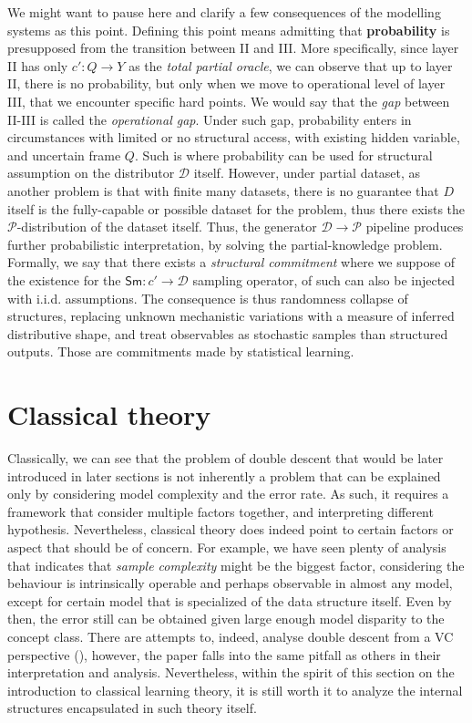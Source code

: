We might want to pause here and clarify a few consequences of the modelling systems as this point. Defining this point means admitting that \textbf{probability} is presupposed from the transition between II and III. More specifically, since layer II has only $c':Q\to Y$ as the \textit{total partial oracle}, we can observe that up to layer II, there is no probability, but only when we move to operational level of layer III, that we encounter specific hard points. We would say that the \textit{gap} between II-III is called the \textit{operational gap}. Under such gap, probability enters in circumstances with limited or no structural access, with existing hidden variable, and uncertain frame $Q$. Such is where probability can be used for structural assumption on the distributor $\mathcal{D}$ itself. However, under partial dataset, as another problem is that with finite many datasets, there is no guarantee that $D$ itself is the fully-capable or possible dataset for the problem, thus there exists the $\mathcal{P}$-distribution of the dataset itself. Thus, the generator $\mathcal{D}\to\mathcal{P}$ pipeline produces further probabilistic interpretation, by solving the partial-knowledge problem. Formally, we say that there exists a \textit{structural commitment} where we suppose of the existence for the $\mathsf{Sm}:c'\to\mathcal{D}$ sampling operator, of such can also be injected with i.i.d. assumptions. The consequence is thus randomness collapse of structures, replacing unknown mechanistic variations with a measure of inferred distributive shape, and treat observables as stochastic samples than structured outputs. Those are commitments made by statistical learning. 


\section{Classical theory}

Classically, we can see that the problem of double descent that would be later introduced in later sections is not inherently a problem that can be explained only by considering model complexity and the error rate. As such, it requires a framework that consider multiple factors together, and interpreting different hypothesis. Nevertheless, classical theory does indeed point to certain factors or aspect that should be of concern. For example, we have seen plenty of analysis that indicates that \textit{sample complexity} might be the biggest factor, considering the behaviour is intrinsically operable and perhaps observable in almost any model, except for certain model that is specialized of the data structure itself. Even by then, the error still can be obtained given large enough model disparity to the concept class. There are attempts to, indeed, analyse double descent from a VC perspective (\cite{lee2022vctheoreticalexplanationdouble}), however, the paper falls into the same pitfall as others in their interpretation and analysis. Nevertheless, within the spirit of this section on the introduction to classical learning theory, it is still worth it to analyze the internal structures encapsulated in such theory itself. 

